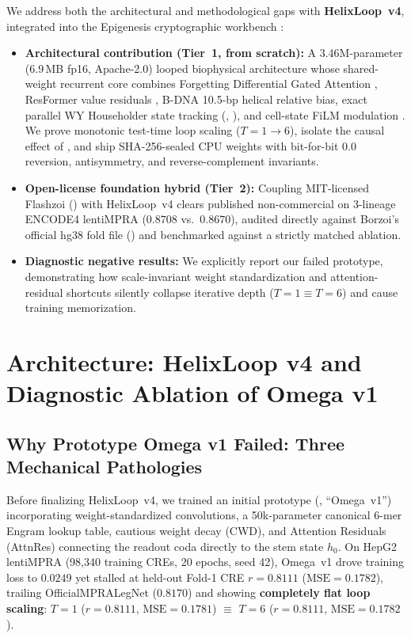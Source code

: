 \documentclass[10.5pt,a4paper]{article}
\begin{document}
We address both the architectural and methodological gaps with \textbf{HelixLoop~v4}, integrated into the Epigenesis cryptographic workbench \citep{todorov2026epigenesis}:
\begin{itemize}
\item \textbf{Architectural contribution (Tier~1, from scratch):} A 3.46M-parameter (6.9\,MB fp16, Apache-2.0) looped biophysical architecture whose shared-weight recurrent core combines Forgetting Differential Gated Attention \citep{ye2025,lin2025}, ResFormer value residuals \citep{zhou2025}, B-DNA 10.5-bp helical relative bias, exact parallel WY Householder state tracking (, \citealp{siems2025}), and cell-state FiLM modulation \citep{perez2018}. We prove monotonic test-time loop scaling ($T=1\to 6$), isolate the causal effect of , and ship SHA-256-sealed CPU weights with bit-for-bit $0.0$ reversion, antisymmetry, and reverse-complement invariants.
\item \textbf{Open-license foundation hybrid (Tier~2):} Coupling MIT-licensed Flashzoi () with HelixLoop~v4 clears published non-commercial  on 3-lineage ENCODE4 lentiMPRA ($0.8708$ vs.\ $0.8670$), audited directly against Borzoi's official hg38 fold file () and benchmarked against a strictly matched  ablation.
\item \textbf{Diagnostic negative results:} We explicitly report our failed  prototype, demonstrating how scale-invariant weight standardization and attention-residual shortcuts silently collapse iterative depth ($T=1\equiv T=6$) and cause training memorization.
\end{itemize}

\section{Architecture: HelixLoop v4 and Diagnostic Ablation of Omega v1}

\subsection{Why Prototype Omega v1 Failed: Three Mechanical Pathologies}

Before finalizing HelixLoop~v4, we trained an initial prototype (, ``Omega~v1'') incorporating weight-standardized convolutions, a 50k-parameter canonical 6-mer Engram lookup table, cautious weight decay (CWD), and Attention Residuals (AttnRes) connecting the readout coda directly to the stem state $h_0$. On HepG2 lentiMPRA (98,340 training CREs, 20 epochs, seed 42), Omega~v1 drove training loss to $0.0249$ yet stalled at held-out Fold-1 CRE $r=0.8111$ ($\text{MSE}=0.1782$), trailing OfficialMPRALegNet ($0.8170$) and showing \textbf{completely flat loop scaling}: $T=1$ ($r=0.8111$, $\text{MSE}=0.1781$) $\equiv$ $T=6$ ($r=0.8111$, $\text{MSE}=0.1782$).
\end{document}
